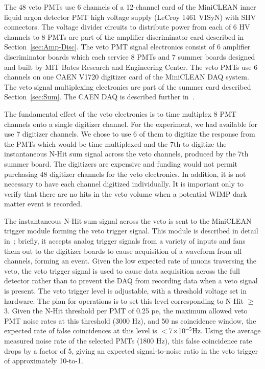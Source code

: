 \documentclass[review,number,sort&compress]{elsarticle}
\begin{document}
The 48 veto PMTs use 6 channels of a 12-channel card of the
MiniCLEAN inner liquid argon detector PMT high voltage supply (LeCroy 1461 VISyN)
with SHV connectors. The voltage divider circuits to distribute power
from each of 6 HV channels to 8 PMTs are part of the amplifier
discriminator card described in Section~\ref{sec:Amp-Disc}. The veto
PMT signal electronics consist of 6 amplifier discriminator boards which each service
8 PMTs and 7 summer boards designed and built by MIT Bates Research and Engineering Center.
The veto PMTs use 6 channels on one CAEN V1720 digitizer
card of the MiniCLEAN DAQ system. The veto signal multiplexing
electronics are part of the summer card described
Section~\ref{sec:Sum}. The CAEN DAQ is described further
in~\cite{ref:gastler_thesis}.

The fundamental effect of the veto electronics is to time multiplex 8
PMT channels onto a single digitizer channel. For the experiment, we
had available for use 7 digitizer channels. We chose to use 6 of them
to digitize the response from the PMTs which would be time multiplexed
and the 7th to digitize the instantaneous N-Hit sum signal across the
veto channels, produced by the 7th summer board. The digitizers are
expensive and funding would not permit purchasing 48 digitizer
channels for the veto electronics. In addition, it is not necessary to
have each channel digitized individually. It is important only to
verify that there are no hits in the veto volume when a potential WIMP
dark matter event is recorded.  

The instantaneous N-Hit sum signal across the veto is sent to the
MiniCLEAN trigger module forming the veto trigger signal.  This module
is described in detail in~\cite{ref:gastler_thesis}; briefly, it
accepts analog trigger signals from a variety of inputs and fans them
out to the digitizer boards to cause acquisition of a waveform from
all channels, forming an event.  Given the low expected rate of muons
traversing the veto, the veto trigger signal is used to cause data
acquisition across the full detector rather than to prevent the DAQ
from recording data when a veto signal is present.  The veto trigger
level is adjustable, with a threshold voltage set in hardware.  The
plan for operations is to set this level corresponding to N-Hit $\ge$
3.  Given the N-Hit threshold per PMT of 0.25 pe, the maximum allowed
veto PMT noise rates at this threshold (3000 Hz), and 50 ns
coincidence window, the expected rate of false coincidences at this
level is $<$7$\times$10$^{-5}$Hz.  Using the average measured noise
rate of the selected PMTs (1800 Hz), this false coincidence rate drops
by a factor of 5, giving an expected signal-to-noise ratio in the veto
trigger of approximately 10-to-1.
\end{document}
